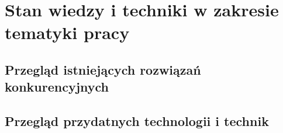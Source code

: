 \chapter{Stan wiedzy i techniki w zakresie tematyki pracy}
\section{Przegląd istniejących rozwiązań konkurencyjnych}
\section{Przegląd przydatnych technologii i technik}